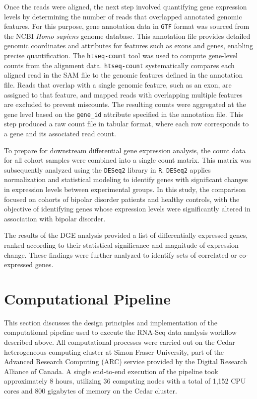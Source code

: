 \documentclass{article}
\begin{document}
Once the reads were aligned, the next step involved quantifying gene expression levels by determining the number of reads that overlapped annotated genomic features. For this purpose, gene annotation data in \texttt{GTF} format was sourced from the NCBI \textit{Homo sapiens} genome database. This annotation file provides detailed genomic coordinates and attributes for features such as exons and genes, enabling precise quantification. The \texttt{htseq-count} tool was used to compute gene-level counts from the alignment data. \texttt{htseq-count} systematically compares each aligned read in the SAM file to the genomic features defined in the annotation file. Reads that overlap with a single genomic feature, such as an exon, are assigned to that feature, and mapped reads with overlapping multiple features are excluded to prevent miscounts. The resulting counts were aggregated at the gene level based on the \texttt{gene\_id} attribute specified in the annotation file. This step produced a raw count file in tabular format, where each row corresponds to a gene and its associated read count.

To prepare for downstream differential gene expression analysis, the count data for all cohort samples were combined into a single count matrix. This matrix was subsequently analyzed using the \texttt{DESeq2} library in \texttt{R}. \texttt{DESeq2} applies normalization and statistical modeling to identify genes with significant changes in expression levels between experimental groups. In this study, the comparison focused on cohorts of bipolar disorder patients and healthy controls, with the objective of identifying genes whose expression levels were significantly altered in association with bipolar disorder.

The results of the DGE analysis provided a list of differentially expressed genes, ranked according to their statistical significance and magnitude of expression change. These findings were further analyzed to identify sets of correlated or co-expressed genes.

\pagebreak

\section{Computational Pipeline}
This section discusses the design principles and implementation of the computational pipeline used to execute the RNA-Seq data analysis workflow described above. All computational processes were carried out on the Cedar heterogeneous computing cluster at Simon Fraser University, part of the Advanced Research Computing (ARC) service provided by the Digital Research Alliance of Canada. A single end-to-end execution of the pipeline took approximately 8 hours, utilizing 36 computing nodes with a total of 1,152 CPU cores and 800 gigabytes of memory on the Cedar cluster.
\end{document}
